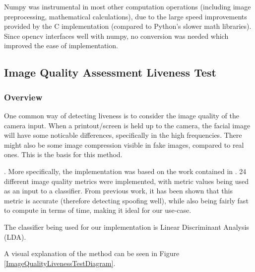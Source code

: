 \documentclass[11pt,a4paper]{article}
\begin{document}
            Numpy was instrumental in most other computation operations (including image preprocessing, mathematical calculations), due to the large speed improvements provided by the C implementation (compared to Python's slower math libraries).
            Since opencv interfaces well with numpy, no conversion was needed which improved the ease of implementation.


        \subsection{Image Quality Assessment Liveness Test}
            \subsubsection{Overview}
            One common way of detecting liveness is to consider the image quality of the camera input. When a printout/screen is held up to the camera, the facial image
            will have some noticable differences, specifically in the high frequencies. There might also be some image compression visible in fake images, compared to real ones.
            This is the basis for this method.

            .
            More specifically, the implementation was based on the work contained in \cite{ImageQualityAssessmentTest}. 24 different image quality metrics were implemented,
            with metric values being used as an input to a classifier. From previous work, it has been shown that this metric is accurate (therefore detecting spoofing well), while
            also being fairly fast to compute in terms of time, making it ideal for our use-case.

            The classifier being used for our implementation is Linear Discriminant Analysis (LDA).

            A visual explanation of the method can be seen in Figure \ref{ImageQualityLivenessTestDiagram}. 
\end{document}
